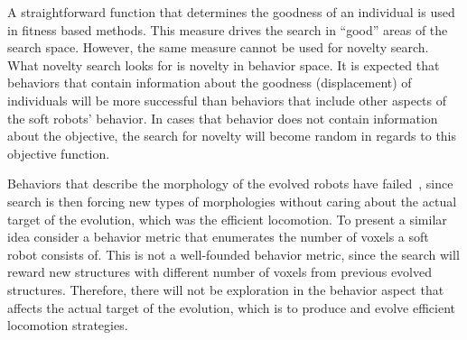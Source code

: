 A straightforward function that determines the goodness of an individual is used in fitness based methods. This measure drives the search in ``good'' areas of the search space. However, the same measure cannot be used for novelty search. What novelty search looks for is novelty in behavior space. It is expected that behaviors that contain information about the goodness (displacement) of individuals will be more successful than behaviors that include other aspects of the soft robots' behavior. In cases that behavior does not contain information about the objective, the search for novelty will become random in regards to this objective function.

Behaviors that describe the morphology of the evolved robots have failed~\citep{lehman2011evolving}, since search is then forcing new types of morphologies without caring about the actual target of the evolution, which was the efficient locomotion. To present a similar idea consider a behavior metric that enumerates the number of voxels a soft robot consists of. This is not a well-founded behavior metric, since the search will reward new structures with different number of voxels from previous evolved structures. Therefore, there will not be exploration in the behavior aspect that affects the actual target of the evolution, which is to produce and evolve efficient locomotion strategies.

